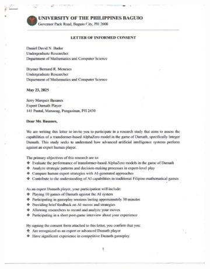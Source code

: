 \begin{appendices}
\begin{figure}[H]
\begin{subfigure}{0.3\textwidth}
        \includegraphics[page=2,width=\linewidth]{images/Letter of Informed Consent.pdf}
    \end{subfigure}
    \begin{subfigure}{0.3\textwidth}
        \centering

\end{subfigure}
\end{figure}
\end{appendices}
